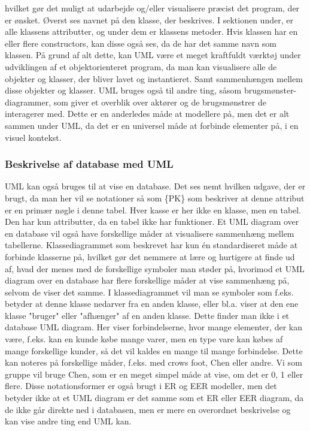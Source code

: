 hvilket gør det muligt at udarbejde og/eller visualisere præcist det program, der er ønsket. Øverst ses navnet på den klasse, der beskrives. I sektionen under, er alle klassens attributter, og under dem er klassens metoder. Hvis klassen har en eller flere constructors, kan disse også ses, da de har det samme navn som klassen. På grund af alt dette, kan UML være et meget kraftfuldt værktøj under udviklingen af et objektorienteret program, da man kan visualisere alle de objekter og klasser, der bliver lavet og instantieret. Samt sammenhængen mellem disse objekter og klasser. UML bruges også til andre ting, såsom brugsmønster-diagrammer, som giver et overblik over aktører og de brugsmønstrer de interagerer med. Dette er en anderledes måde at modellere på, men det er alt sammen under UML, da det er en universel måde at forbinde elementer på, i en visuel kontekst.


\subsubsection{Beskrivelse af database med UML}
UML kan også bruges til at vise en database. Det ses nemt hvilken udgave, der er brugt, da man her vil se notationer så som \{PK\} som beskriver at denne attribut er en primær nøgle i denne tabel. Hver kasse er her ikke en klasse, men en tabel. Den har kun attributter, da en tabel ikke har funktioner. Et UML diagram over en database vil også have forskellige måder at visualisere sammenhæng mellem tabellerne.
Klassediagrammet som beskrevet har kun én standardiseret måde at forbinde klasserne på, hvilket gør det nemmere at lære og hurtigere at finde ud af, hvad der menes med de forskellige symboler man støder på, hvorimod et UML diagram over en database har flere forskellige måder at vise sammenhæng på, selvom de viser det samme. I klassediagrammet vil man se symboler som f.eks. betyder at denne klasse nedarver fra en anden klasse, eller bl.a. viser at den ene klasse "bruger" eller "afhænger" af en anden klasse. Dette finder man ikke i et database UML diagram. Her viser forbindelserne, hvor mange elementer, der kan være, f.eks. kan en kunde købe mange varer, men en type vare kan købes af mange forskellige kunder, så det vil kaldes en mange til mange forbindelse. Dette kan noteres på forskellige måder, f.eks. med crows foot, Chen eller andre. Vi som gruppe vil bruge Chen, som er en meget simpel måde at vise, om det er 0, 1 eller flere. Disse notationsformer er også brugt i ER og EER modeller, men det betyder ikke at et UML diagram er det samme som et ER eller EER diagram, da de ikke går direkte ned i databasen, men er mere en overordnet beskrivelse og kan vise andre ting end UML kan.

